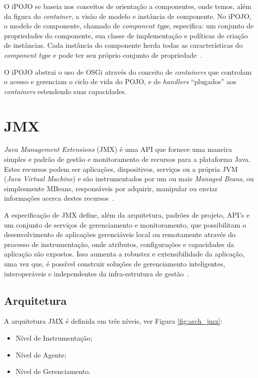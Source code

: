 O iPOJO se baseia nos conceitos de orientação a componentes, onde temos, além da figura do \textit{container}, a visão de modelo e instância de componente. No iPOJO, o modelo de componente, chamado de \textit{component type}, especifica: um conjunto de propriedades do componente, sua classe de implementação e políticas de criação de instâncias. Cada instância do componente herda todas as características do \textit{component type} e pode ter seu próprio conjunto de propriedade~\cite{ipojo}.

O iPOJO abstrai o uso de OSGi através do conceito de \textit{containers} que controlam o acesso e gerenciam o ciclo de vida do POJO, e de \textit{handlers} ``plugados'' aos \textit{containers} estendendo suas capacidades.


\section{JMX}
\textit{Java Management Extensions} (JMX) é uma API que fornece uma maneira simples e padrão de gestão e monitoramento de recursos para a plataforma Java. Estes recursos podem ser aplicações, dispositivos, serviços ou a própria JVM (\textit{Java Virtual Machine}) e são instrumentados por um ou mais \textit{Managed Beans}, ou simplesmente MBeans, responsáveis por adquirir, manipular ou enviar informações acerca destes recursos~\cite{lindfors2002jmx}.

A especificação de JMX define, além da arquitetura, padrões de projeto, API's e um conjunto de serviços de gerenciamento e monitoramento, que possibilitam o desenvolvimento de aplicações gerenciáveis local ou remotamente através do processo de instrumentação, onde atributos, configurações e capacidades da aplicação são expostos. Isso aumenta a robustez e extensibilidade da aplicação, uma vez que, é possível construir soluções de gerenciamento inteligentes, interoperáveis e independentes da infra-estrutura de gestão~\cite{jmx}.

\subsection{Arquitetura}
\label{subsec:arch}
A arquitetura JMX é definida em três níveis, ver Figura \ref{fig:arch_jmx}:

\begin{itemize}
 \item Nível de Instrumentação;
 \item Nível de Agente;
 \item Nível de Gerenciamento.
\end{itemize}

